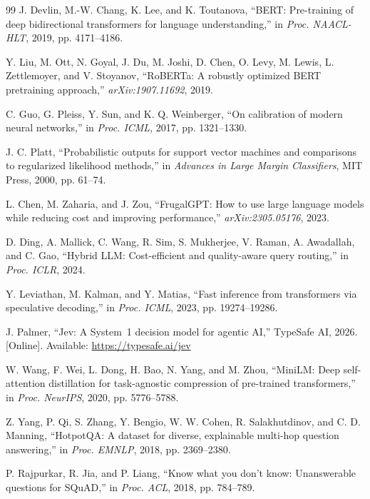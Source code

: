 \documentclass[twocolumn]{ICCKjournal}
\begin{document}
\begin{fullwidth}
\begin{thebibliography}{99}
J. Devlin, M.-W. Chang, K. Lee, and K. Toutanova, ``BERT: Pre-training of deep bidirectional transformers for language understanding,'' in \textit{Proc. NAACL-HLT}, 2019, pp. 4171--4186.

Y. Liu, M. Ott, N. Goyal, J. Du, M. Joshi, D. Chen, O. Levy, M. Lewis, L. Zettlemoyer, and V. Stoyanov, ``RoBERTa: A robustly optimized BERT pretraining approach,'' \textit{arXiv:1907.11692}, 2019.

C. Guo, G. Pleiss, Y. Sun, and K. Q. Weinberger, ``On calibration of modern neural networks,'' in \textit{Proc. ICML}, 2017, pp. 1321--1330.

J. C. Platt, ``Probabilistic outputs for support vector machines and comparisons to regularized likelihood methods,'' in \textit{Advances in Large Margin Classifiers}, MIT Press, 2000, pp. 61--74.

L. Chen, M. Zaharia, and J. Zou, ``FrugalGPT: How to use large language models while reducing cost and improving performance,'' \textit{arXiv:2305.05176}, 2023.

D. Ding, A. Mallick, C. Wang, R. Sim, S. Mukherjee, V. Raman, A. Awadallah, and C. Gao, ``Hybrid LLM: Cost-efficient and quality-aware query routing,'' in \textit{Proc. ICLR}, 2024.

Y. Leviathan, M. Kalman, and Y. Matias, ``Fast inference from transformers via speculative decoding,'' in \textit{Proc. ICML}, 2023, pp. 19274--19286.

J. Palmer, ``Jev: A System~1 decision model for agentic AI,'' TypeSafe AI, 2026. [Online]. Available: \url{https://typesafe.ai/jev}

W. Wang, F. Wei, L. Dong, H. Bao, N. Yang, and M. Zhou, ``MiniLM: Deep self-attention distillation for task-agnostic compression of pre-trained transformers,'' in \textit{Proc. NeurIPS}, 2020, pp. 5776--5788.

Z. Yang, P. Qi, S. Zhang, Y. Bengio, W. W. Cohen, R. Salakhutdinov, and C. D. Manning, ``HotpotQA: A dataset for diverse, explainable multi-hop question answering,'' in \textit{Proc. EMNLP}, 2018, pp. 2369--2380.

P. Rajpurkar, R. Jia, and P. Liang, ``Know what you don't know: Unanswerable questions for SQuAD,'' in \textit{Proc. ACL}, 2018, pp. 784--789.


\end{thebibliography}
\end{fullwidth}
\end{document}

